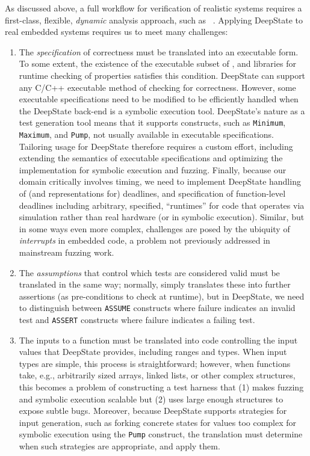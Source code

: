 As discussed above, a full workflow for verification of realistic systems requires a first-class, flexible, \emph{dynamic} analysis approach, such as \deepstate~\cite{DeepState}.  Applying DeepState to real embedded systems requires us to meet many challenges:

\begin{enumerate}[labelsep=3pt,leftmargin=12pt]
\item The \emph{specification} of correctness must be translated into an executable form.  To some extent, the existence of the \eacsl executable subset of \acsl, and libraries for runtime checking of properties satisfies this condition.  DeepState can support any C/C++ executable method of checking for correctness.  However, some executable specifications need to be modified to be efficiently handled when the DeepState back-end is a symbolic execution tool.  DeepState's nature as a test generation tool means that it supports constructs, such as {\tt Minimum}, {\tt Maximum}, and {\tt Pump}, not usually available in executable specifications.  Tailoring \eacsl usage for DeepState therefore requires a custom effort, including extending the semantics of executable specifications and optimizing the implementation for symbolic execution and fuzzing.  Finally, because our domain critically involves timing, we need to implement DeepState handling of (and \eacsl representations for) deadlines, and specification of function-level deadlines including arbitrary, specified, ``runtimes'' for code that operates via simulation rather than real hardware (or in symbolic execution).  Similar, but in some ways even more complex, challenges are posed by the ubiquity of \emph{interrupts} in embedded code, a problem not previously addressed in mainstream fuzzing work.
\item The \emph{assumptions} that control which tests are considered valid must be translated in the same way; normally, \eacsl simply translates these into further assertions (as pre-conditions to check at runtime), but in DeepState, we need to distinguish between {\tt ASSUME} constructs where failure indicates an invalid test and {\tt ASSERT} constructs where failure indicates a failing test.  
\item The inputs to a function must be translated into code controlling the input values that DeepState provides, including ranges and types.  When input types are simple, this process is straightforward; however, when functions take, e.g., arbitrarily sized arrays, linked lists, or other complex structures, this becomes a problem of constructing a test harness that (1) makes fuzzing and symbolic execution scalable but (2) uses large enough structures to expose subtle bugs.  Moreover, because DeepState supports strategies for input generation, such as forking concrete states for values too complex for symbolic execution using the {\tt Pump} construct, the translation must determine when such strategies are appropriate, and apply them.

\end{enumerate}

